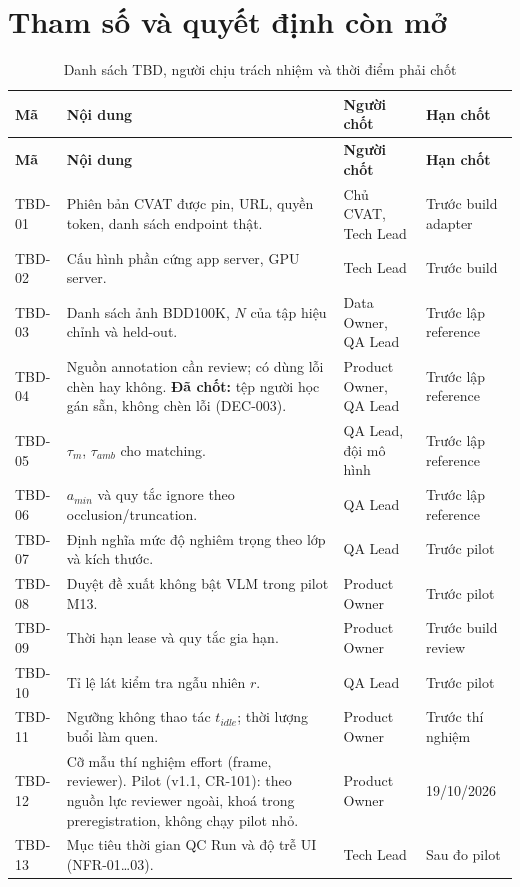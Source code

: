 \section{Tham số và quyết định còn mở}
\label{sec:tbd}
\begin{xltabular}{\linewidth}{@{}L{1.4cm}Y L{3cm}L{2.6cm}@{}}
\caption{Danh sách TBD, người chịu trách nhiệm và thời điểm phải chốt}\label{tab:tbd}\\
\toprule
\textbf{Mã} & \textbf{Nội dung} & \textbf{Người chốt} & \textbf{Hạn chốt}\\
\midrule
\endfirsthead
\toprule \textbf{Mã} & \textbf{Nội dung} & \textbf{Người chốt} & \textbf{Hạn chốt}\\ \midrule
\endhead
\bottomrule
\endfoot
TBD-01 & Phiên bản CVAT được pin, URL, quyền token, danh sách endpoint thật. & Chủ CVAT, Tech Lead & Trước build adapter\\
TBD-02 & Cấu hình phần cứng app server, GPU server. & Tech Lead & Trước build\\
TBD-03 & Danh sách ảnh BDD100K, \(N\) của tập hiệu chỉnh và held-out. & Data Owner, QA Lead & Trước lập reference\\
TBD-04 & Nguồn annotation cần review; có dùng lỗi chèn hay không. \textbf{Đã chốt:} tệp người học gán sẵn, không chèn lỗi (DEC-003). & Product Owner, QA Lead & Trước lập reference\\
TBD-05 & \(\tau_m\), \(\tau_{amb}\) cho matching. & QA Lead, đội mô hình & Trước lập reference\\
TBD-06 & \(a_{min}\) và quy tắc ignore theo occlusion/truncation. & QA Lead & Trước lập reference\\
TBD-07 & Định nghĩa mức độ nghiêm trọng theo lớp và kích thước. & QA Lead & Trước pilot\\
TBD-08 & Duyệt đề xuất không bật VLM trong pilot M13. & Product Owner & Trước pilot\\
TBD-09 & Thời hạn lease và quy tắc gia hạn. & Product Owner & Trước build review\\
TBD-10 & Tỉ lệ lát kiểm tra ngẫu nhiên \(r\). & QA Lead & Trước pilot\\
TBD-11 & Ngưỡng không thao tác \(t_{idle}\); thời lượng buổi làm quen. & Product Owner & Trước thí nghiệm\\
TBD-12 & Cỡ mẫu thí nghiệm effort (frame, reviewer). Pilot (v1.1, CR-101): theo nguồn lực reviewer ngoài, khoá trong preregistration, không chạy pilot nhỏ. & Product Owner & 19/10/2026\\
TBD-13 & Mục tiêu thời gian QC Run và độ trễ UI (NFR-01…03). & Tech Lead & Sau đo pilot\\

\end{xltabular}
